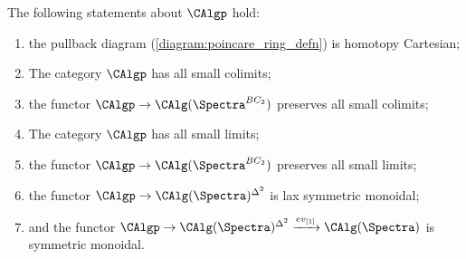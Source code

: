 \begin{theorem}
The following statements about $\CAlgp$ hold:
\begin{enumerate}
\item \label{thmitem:defining_diagram_homotopy_pullback} the pullback diagram (\ref{diagram:poincare_ring_defn}) is homotopy Cartesian; %
\item \label{thmitem:poincare_ring_has_colimits} The category $\CAlgp$ has all small colimits;
\item \label{thmitem:poincare_ring_to_ring_preserves_colims} the functor $ \CAlgp \to \CAlg(\Spectra^{BC_2})$ preserves all small colimits;
\item \label{thmitem:poincare_ring_has_limits} The category $\CAlgp$ has all small limits;
\item \label{thmitem:poincare_ring_to_ring_preserves_lims} the functor $ \CAlgp \to \CAlg(\Spectra^{BC_2})$ preserves all small limits;
\item the functor $ \CAlgp\to \CAlg(\Spectra)^{\Delta^2}$ is lax symmetric monoidal;
\item and the functor $ \CAlgp\to \CAlg(\Spectra)^{\Delta^2}\xrightarrow{ev_{[1]}} \CAlg(\Spectra)$ is symmetric monoidal.
\end{enumerate}
\end{theorem}
